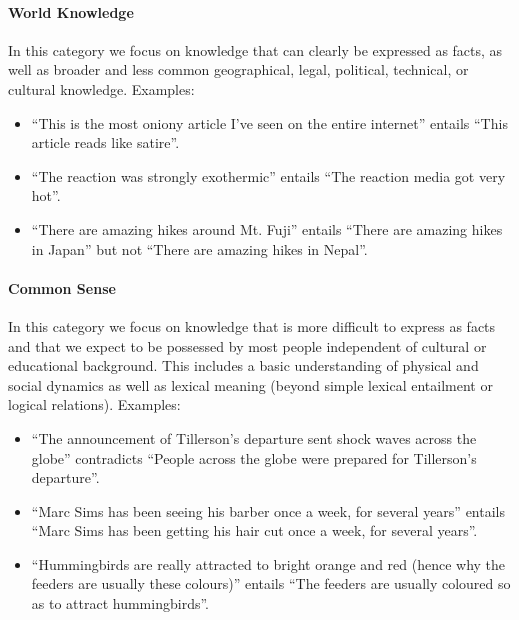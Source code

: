 \documentclass{article} \usepackage{iclr2019_conference,times}
\begin{document}
\paragraph{World Knowledge} In this category we focus on knowledge that can clearly be expressed as facts, as well as broader and less common geographical, legal, political, technical, or cultural knowledge. Examples:
\begin{itemize}
    \item ``This is the most oniony article I've seen on the entire internet'' entails ``This article reads like satire''.
    \item ``The reaction was strongly exothermic'' entails ``The reaction media got very hot''.
    \item ``There are amazing hikes around Mt. Fuji'' entails ``There are amazing hikes in Japan'' but not ``There are amazing hikes in Nepal''.
\end{itemize}

\paragraph{Common Sense} In this category we focus on knowledge that is more difficult to express as facts and that we expect to be possessed by most people independent of cultural or educational background. This includes a basic understanding of physical and social dynamics as well as lexical meaning (beyond simple lexical entailment or logical relations). Examples:
\begin{itemize}
    \item ``The announcement of Tillerson's departure sent shock waves across the globe'' contradicts ``People across the globe were prepared for Tillerson's departure''.
    \item ``Marc Sims has been seeing his barber once a week, for several years'' entails ``Marc Sims has been getting his hair cut once a week, for several years''.
    \item ``Hummingbirds are really attracted to bright orange and red (hence why the feeders are usually these colours)'' entails ``The feeders are usually coloured so as to attract hummingbirds''.
\end{itemize}
\end{document}
